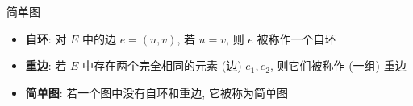 \begin{frame}[fragile]{简单图}
	\begin{itemize}
		\item<1->\textbf{自环}: 对 \(E\) 中的边 \(e = (u, v)\), 若 \(u = v\), 则 \(e\) 被称作一个自环
		\item<2->\textbf{重边}: 若 \(E\) 中存在两个完全相同的元素 (边) \(e_1, e_2\), 则它们被称作 (一组) 重边
		\item<3->\textbf{简单图}: 若一个图中没有自环和重边, 它被称为简单图

	\end{itemize}

\end{frame}
